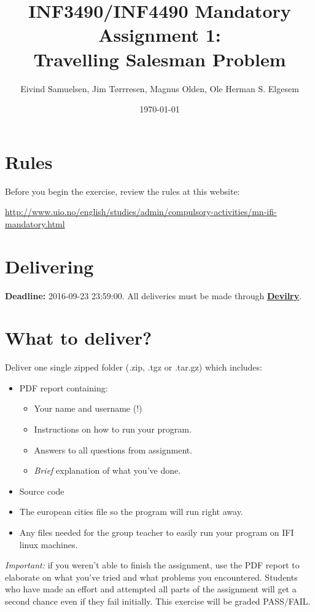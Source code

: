 \documentclass{article}           %
\title{\vspace{-2cm}INF3490/INF4490 Mandatory Assignment 1:\\
Travelling Salesman Problem}
\author{Eivind Samuelsen, Jim Tørrresen, Magnus Olden, Ole Herman S. Elgesem}
\date{\today}
\newcommand\marginsymbol[1][0pt]{%
  \tabto*{0cm}\makebox[\dimexpr-1cm-#1\relax][r]{$\mathbb{P}$}\tabto*{\TabPrevPos}}
\begin{document}
    \renewcommand\marginsymbol[1][0pt]{%
  \tabto*{0cm}\makebox[-1cm][c]{$\mathbb{P}$}\tabto*{\TabPrevPos}}

\maketitle
\section*{Rules}
Before you begin the exercise, review the rules at this website:
\begin{center}
\url{http://www.uio.no/english/studies/admin/compulsory-activities/mn-ifi-mandatory.html}
\end{center}
\section*{Delivering}
\textbf{Deadline:} 2016-09-23 23:59:00. All deliveries must be made through
\href{https://devilry.ifi.uio.no}{\textbf{Devilry}}.
\section*{What to deliver?}
Deliver one single zipped folder (.zip, .tgz or .tar.gz) which includes:
\begin{itemize}
    \item PDF report containing:
    \begin{itemize}
        \item Your name and username (!)
        \item Instructions on how to run your program.
        \item Answers to all questions from assignment.
        \item \emph{Brief} explanation of what you've done.
    \end{itemize}
    \item Source code
    \item The european cities file so the program will run right away.
    \item Any files needed for the group teacher to easily run your program on
          IFI linux machines.
\end{itemize}
\emph{Important: } if you weren't able to finish the assignment, use the PDF
report to elaborate on what you've tried and what problems you encountered.
Students who have made an effort and attempted all parts of the assignment
will get a second chance even if they fail initially. This exercise will be
graded PASS/FAIL.
\end{document}
